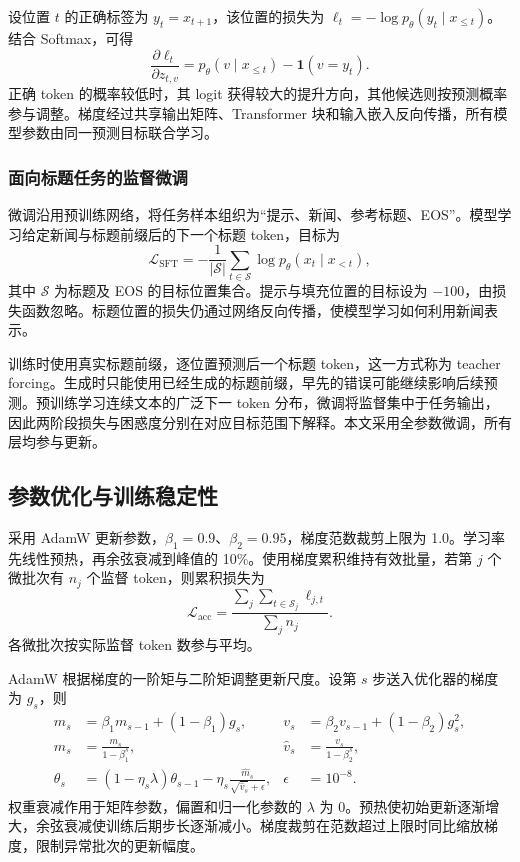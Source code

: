 \documentclass[UTF8,a4paper,12pt,fontset=fandol]{ctexart}
\begin{document}
设位置 $t$ 的正确标签为 $y_t=x_{t+1}$，该位置的损失为 $\ell_t=-\log p_\theta(y_t\mid x_{\le t})$。结合 Softmax，可得
\begin{equation}
 \frac{\partial\ell_t}{\partial z_{t,v}}=p_\theta(v\mid x_{\le t})-\mathbf{1}(v=y_t).
\end{equation}
正确 token 的概率较低时，其 logit 获得较大的提升方向，其他候选则按预测概率参与调整。梯度经过共享输出矩阵、Transformer 块和输入嵌入反向传播，所有模型参数由同一预测目标联合学习。

\subsubsection{面向标题任务的监督微调}
微调沿用预训练网络，将任务样本组织为“提示、新闻、参考标题、EOS”。模型学习给定新闻与标题前缀后的下一个标题 token，目标为
\begin{equation}
 \mathcal{L}_{\mathrm{SFT}}=-\frac{1}{|\mathcal{S}|}\sum_{t\in\mathcal{S}}\log p_\theta(x_t\mid x_{<t}),
\end{equation}
其中 $\mathcal{S}$ 为标题及 EOS 的目标位置集合。提示与填充位置的目标设为 $-100$，由损失函数忽略。标题位置的损失仍通过网络反向传播，使模型学习如何利用新闻表示。

训练时使用真实标题前缀，逐位置预测后一个标题 token，这一方式称为 teacher forcing。生成时只能使用已经生成的标题前缀，早先的错误可能继续影响后续预测。预训练学习连续文本的广泛下一 token 分布，微调将监督集中于任务输出，因此两阶段损失与困惑度分别在对应目标范围下解释。本文采用全参数微调，所有层均参与更新。

\subsection{参数优化与训练稳定性}
采用 AdamW 更新参数，$\beta_1=0.9$、$\beta_2=0.95$，梯度范数裁剪上限为 1.0。学习率先线性预热，再余弦衰减到峰值的 10\%。使用梯度累积维持有效批量，若第 $j$ 个微批次有 $n_j$ 个监督 token，则累积损失为
\begin{equation}
 \mathcal{L}_{\mathrm{acc}}=\frac{\sum_j\sum_{t\in\mathcal{S}_j}\ell_{j,t}}{\sum_j n_j}.
\end{equation}
各微批次按实际监督 token 数参与平均。

AdamW 根据梯度的一阶矩与二阶矩调整更新尺度。设第 $s$ 步送入优化器的梯度为 $g_s$，则
\begin{align}
 m_s&=\beta_1m_{s-1}+(1-\beta_1)g_s, & v_s&=\beta_2v_{s-1}+(1-\beta_2)g_s^2,\\
 \widehat m_s&=\frac{m_s}{1-\beta_1^s}, & \widehat v_s&=\frac{v_s}{1-\beta_2^s},\\
 \theta_s&=(1-\eta_s\lambda)\theta_{s-1}-\eta_s\frac{\widehat m_s}{\sqrt{\widehat v_s}+\epsilon}, & \epsilon&=10^{-8}.
\end{align}
权重衰减作用于矩阵参数，偏置和归一化参数的 $\lambda$ 为 0。预热使初始更新逐渐增大，余弦衰减使训练后期步长逐渐减小。梯度裁剪在范数超过上限时同比缩放梯度，限制异常批次的更新幅度。
\end{document}
